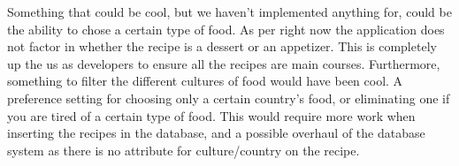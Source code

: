 Something that could be cool, but we haven't implemented anything for, could be the ability to chose a certain type of food. As per right now the application does not factor in whether the recipe is a dessert or an appetizer. This is completely up the us as developers to ensure all the recipes are main courses. Furthermore, something to filter the different cultures of food would have been cool. A preference setting for choosing only a certain country's food, or eliminating one if you are tired of a certain type of food. This would require more work when inserting the recipes in the database, and a possible overhaul of the database system as there is no attribute for culture/country on the recipe.